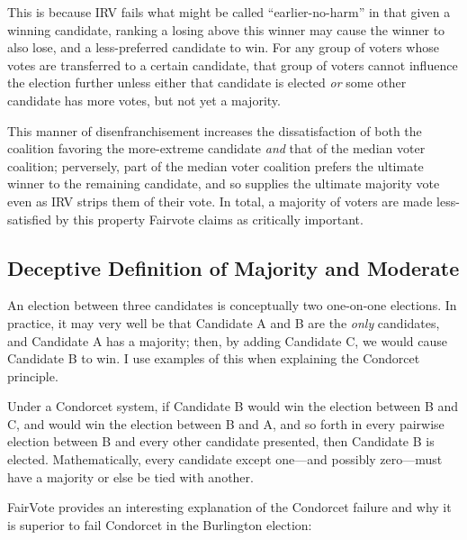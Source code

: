 This is because IRV fails what might be called ``earlier-no-harm'' in that given a winning candidate, ranking a losing above this winner may cause the winner to also lose, and a less-preferred candidate to win.  For any group of voters whose votes are transferred to a certain candidate, that group of voters cannot influence the election further unless either that candidate is elected \textit{or} some other candidate has more votes, but not yet a majority.

This manner of disenfranchisement increases the dissatisfaction of both the coalition favoring the more-extreme candidate \textit{and} that of the median voter coalition; perversely, part of the median voter coalition prefers the ultimate winner to the remaining candidate, and so supplies the ultimate majority vote even as IRV strips them of their vote.  In total, a majority of voters are made less-satisfied by this property Fairvote claims as critically important.

\subsection{Deceptive Definition of Majority and Moderate}

An election between three candidates is conceptually two one-on-one elections.  In practice, it may very well be that Candidate A and B are the \textit{only} candidates, and Candidate A has a majority; then, by adding Candidate C, we would cause Candidate B to win.  I use examples of this when explaining the Condorcet principle.

Under a Condorcet system, if Candidate B would win the election between B and C, and would win the election between B and A, and so forth in every pairwise election between B and every other candidate presented, then Candidate B is elected.  Mathematically, every candidate except one—and possibly zero—must have a majority or else be tied with another.

FairVote provides an interesting explanation of the Condorcet failure and why it is superior to fail Condorcet in the Burlington election:


